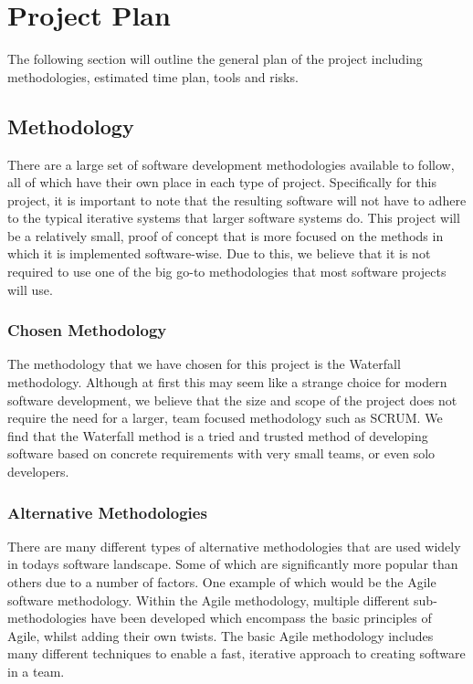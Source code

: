 \documentclass{article}
\begin{document}
\section{Project Plan}
The following section will outline the general plan of the project including methodologies, estimated time plan, tools and risks.
\subsection{Methodology}
There are a large set of software development methodologies available to follow, all of which have their own place in each type of project.
Specifically for this project, it is important to note that the resulting software will not have to adhere to the typical iterative systems
that larger software systems do. This project will be a relatively small, proof of concept that is more focused on the methods in which it
is implemented software-wise. Due to this, we believe that it is not required to use one of the big go-to methodologies that most software
projects will use.

\subsubsection{Chosen Methodology}
The methodology that we have chosen for this project is the Waterfall methodology. Although at first this may seem like a strange choice for
modern software development, we believe that the size and scope of the project does not require the need for a larger, team focused
methodology such as SCRUM. We find that the Waterfall method is a tried and trusted method of developing software based on
concrete requirements with very small teams, or even solo developers.

\subsubsection{Alternative Methodologies}
There are many different types of alternative methodologies that are used widely in todays software landscape. Some of which are
significantly more popular than others due to a number of factors. One example of which would be the Agile software methodology. Within the
Agile methodology, multiple different sub-methodologies have been developed which encompass the basic principles of Agile, whilst adding
their own twists. The basic Agile methodology includes many different techniques to enable a fast, iterative approach to creating software
in a team.
\end{document}

